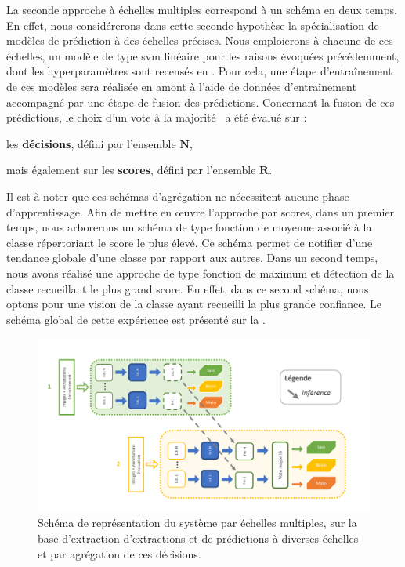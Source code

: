 La seconde approche à échelles multiples correspond à un schéma en deux temps. En effet, nous considérerons dans cette seconde hypothèse la spécialisation de modèles de prédiction à des échelles précises. Nous emploierons à chacune de ces échelles, un modèle de type \gls{svm} linéaire pour les raisons évoquées précédemment, dont les hyperparamètres sont recensés en . Pour cela, une étape d'entraînement de ces modèles sera réalisée en amont à l'aide de données d'entraînement accompagné par une étape de fusion des prédictions. Concernant la fusion de ces prédictions, le choix d'un vote à la majorité~\cite{Kam1994,Lam1997} a été évalué sur : 
\begin{inlinerate}
    \item les \textbf{décisions}, défini par l'ensemble $\mathbf{N}$,
    \item mais également sur les \textbf{scores}, défini par l'ensemble $\mathbf{R}$.
\end{inlinerate}
Il est à noter que ces schémas d'agrégation ne nécessitent aucune phase d'apprentissage. Afin de mettre en œuvre l'approche par scores, dans un premier temps, nous arborerons un schéma de type fonction de moyenne associé à la classe répertoriant le score le plus élevé. Ce schéma permet de notifier d'une tendance globale d'une classe par rapport aux autres. Dans un second temps, nous avons réalisé une approche de type fonction de maximum et détection de la classe recueillant le plus grand score. En effet, dans ce second schéma, nous optons pour une vision de la classe ayant recueilli la plus grande confiance. Le schéma global de cette expérience est présenté sur la .\par

\begin{figure}[H]
    \centering
    \includegraphics[width=\linewidth]{contents/chapter_5/resources/scheme_multiscale_decision.pdf}
    \caption{Schéma de représentation du système par échelles multiples, sur la base d'extraction d'extractions et de prédictions à diverses échelles et par agrégation de ces décisions.}
    \label{fig:scheme_multiscale_decision}
\end{figure}\par

